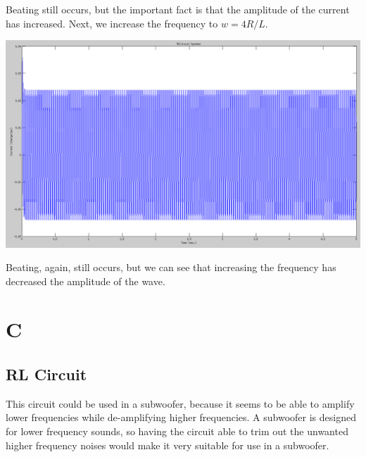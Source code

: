 \documentclass[titlepage,12pt]{article}
\begin{document}
\noindent Beating still occurs, but the important fact is that the amplitude of the current has increased. Next, we increase the frequency to $w = 4R/L$.

\begin{center}
  \includegraphics[scale=0.25]{r10l01w4rl.png}
\end{center}

\noindent Beating, again, still occurs, but we can see that increasing the frequency has decreased the amplitude of the wave.

\section*{C}

\subsection*{RL Circuit}
\noindent This circuit could be used in a subwoofer, because it seems to be able to amplify lower frequencies while de-amplifying higher frequencies. A subwoofer is designed for lower frequency sounds, so having the circuit able to trim out the unwanted higher frequency noises would make it very suitable for use in a subwoofer.
\end{document}
